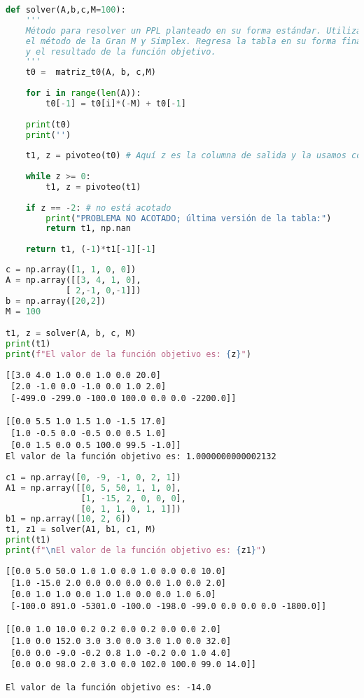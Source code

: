 \begin{lstlisting}[language=Python]
def solver(A,b,c,M=100):
    '''
    Método para resolver un PPL planteado en su forma estándar. Utiliza
    el método de la Gran M y Simplex. Regresa la tabla en su forma final
    y el resultado de la función objetivo.
    '''
    t0 =  matriz_t0(A, b, c,M)
    
    for i in range(len(A)):
        t0[-1] = t0[i]*(-M) + t0[-1]
    
    print(t0)
    print('')
    
    t1, z = pivoteo(t0) # Aquí z es la columna de salida y la usamos como control para saber si terminó.
    
    while z >= 0:
        t1, z = pivoteo(t1)
    
    if z == -2: # no está acotado
        print("PROBLEMA NO ACOTADO; última versión de la tabla:")
        return t1, np.nan
    
    return t1, (-1)*t1[-1][-1]
\end{lstlisting}

\begin{lstlisting}[language=Python]
c = np.array([1, 1, 0, 0])
A = np.array([[3, 4, 1, 0],
            [ 2,-1, 0,-1]])
b = np.array([20,2])
M = 100

t1, z = solver(A, b, c, M)
print(t1)
print(f"El valor de la función objetivo es: {z}")
\end{lstlisting}

\begin{lstlisting}
[[3.0 4.0 1.0 0.0 1.0 0.0 20.0]
 [2.0 -1.0 0.0 -1.0 0.0 1.0 2.0]
 [-499.0 -299.0 -100.0 100.0 0.0 0.0 -2200.0]]

[[0.0 5.5 1.0 1.5 1.0 -1.5 17.0]
 [1.0 -0.5 0.0 -0.5 0.0 0.5 1.0]
 [0.0 1.5 0.0 0.5 100.0 99.5 -1.0]]
El valor de la función objetivo es: 1.0000000000002132
\end{lstlisting}

\begin{lstlisting}[language=Python]
c1 = np.array([0, -9, -1, 0, 2, 1])
A1 = np.array([[0, 5, 50, 1, 1, 0],
               [1, -15, 2, 0, 0, 0],
               [0, 1, 1, 0, 1, 1]])
b1 = np.array([10, 2, 6])
t1, z1 = solver(A1, b1, c1, M)
print(t1)
print(f"\nEl valor de la función objetivo es: {z1}")
\end{lstlisting}

\begin{lstlisting}
[[0.0 5.0 50.0 1.0 1.0 0.0 1.0 0.0 0.0 10.0]
 [1.0 -15.0 2.0 0.0 0.0 0.0 0.0 1.0 0.0 2.0]
 [0.0 1.0 1.0 0.0 1.0 1.0 0.0 0.0 1.0 6.0]
 [-100.0 891.0 -5301.0 -100.0 -198.0 -99.0 0.0 0.0 0.0 -1800.0]]

[[0.0 1.0 10.0 0.2 0.2 0.0 0.2 0.0 0.0 2.0]
 [1.0 0.0 152.0 3.0 3.0 0.0 3.0 1.0 0.0 32.0]
 [0.0 0.0 -9.0 -0.2 0.8 1.0 -0.2 0.0 1.0 4.0]
 [0.0 0.0 98.0 2.0 3.0 0.0 102.0 100.0 99.0 14.0]]

El valor de la función objetivo es: -14.0
\end{lstlisting}

